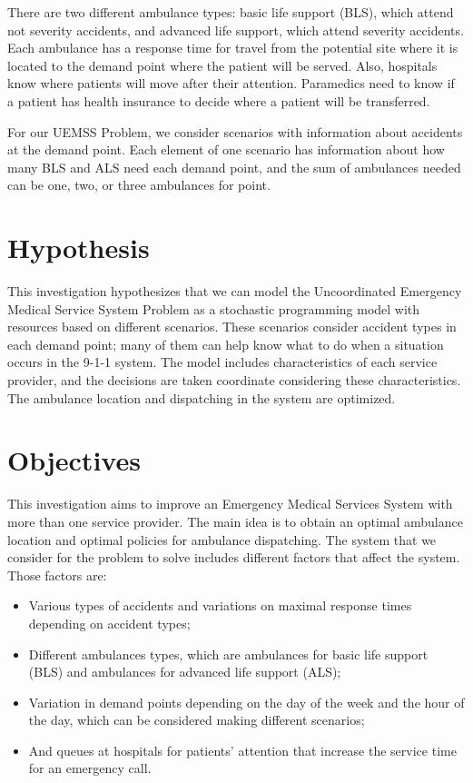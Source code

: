 There are two different ambulance types: basic life support (BLS), which attend not severity accidents, and advanced life support, which attend severity accidents. Each ambulance has a response time for travel from the potential site where it is located to the demand point where the patient will be served. Also, hospitals know where patients will move after their attention. Paramedics need to know if a patient has health insurance to decide where a patient will be transferred. 

For our UEMSS Problem, we consider scenarios with information about ac\-ci\-dents at the demand point. Each element of one scenario has information about how many BLS and ALS need each demand point, and the sum of ambulances needed can be one, two, or three ambulances for point.

\section{Hypothesis}
This investigation hypothesizes that we can model the Uncoordinated Emergency Medical Service System Problem as a stochastic programming model with resources based on different scenarios. These scenarios consider accident types in each demand point; many of them can help know what to do when a situation occurs in the 9-1-1 system. The model includes characteristics of each service provider, and the decisions are taken coordinate considering these characteristics. The ambulance location and dispatching in the system are optimized.


\section{Objectives}
This investigation aims to improve an Emergency Medical Services System with more than one service provider. The main idea is to obtain an optimal ambulance location and optimal policies for ambulance dispatching. The system that we consider for the problem to solve includes different factors that affect the system. Those factors are:
\begin{itemize}

\item Various types of accidents and variations on maximal response times depending on accident types; 

\item Different ambulances types, which are ambulances for basic life support (BLS) and ambulances for advanced life support (ALS);

\item Variation in demand points depending on the day of the week and the hour of the day, which can be considered making different scenarios;

\item And queues at hospitals for patients' attention that increase the service time for an emergency call.

\end{itemize} 

